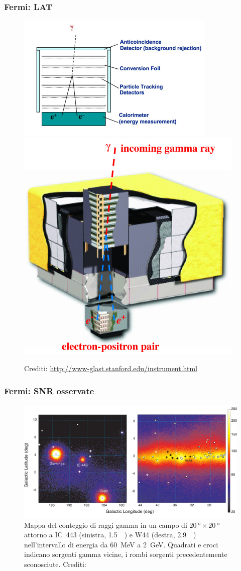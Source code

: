 \documentclass[10pt]{beamer}
\begin{document}
\begin{frame}
  \frametitle{Fermi: LAT}
  \begin{figure}
    \centering
    \includegraphics[width=0.6\columnwidth]{Gamma_telescope_schematic}
    \includegraphics[width=0.4\columnwidth]{f1}
    \caption{Crediti: \url{http://www-glast.stanford.edu/instrument.html}}
  \end{figure}
\end{frame}

\begin{frame}
  \frametitle{Fermi: SNR osservate}
  \begin{figure}
    \centering
    \includegraphics[width=0.8\columnwidth]{1231160fig1.pdf}
    \caption{Mappa del conteggio di raggi gamma in un campo di
      $\SI{20}{\degree} \times \SI{20}{\degree}$ attorno a IC~443 (sinistra,
      \SI{1.5}{\kilo \parsec}) e W44 (destra, \SI{2.9}{\kilo \parsec})
      nell'intervallo di energia da \SI{60}{\mega\electronvolt} a
      \SI{2}{\giga\electronvolt}.  Quadrati e croci indicano sorgenti gamma
      vicine, i rombi sorgenti precedentemente sconosciute.  Crediti:
      \textcite{2013Sci...339..807A}}
  \end{figure}
\end{frame}
\end{document}
